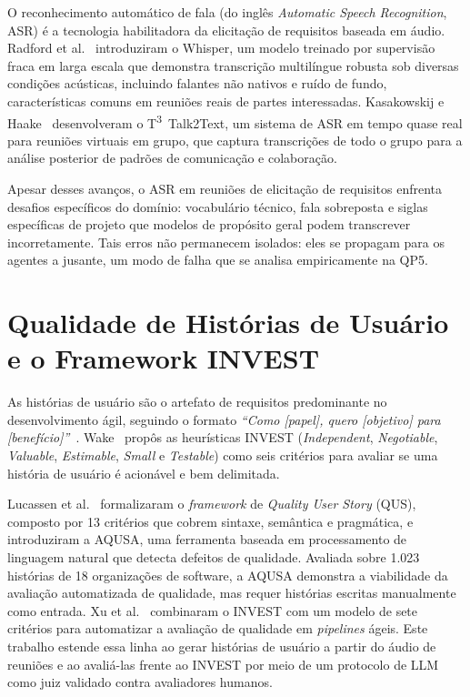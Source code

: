 O reconhecimento automático de fala (do inglês \textit{Automatic Speech Recognition}, ASR) é a tecnologia habilitadora da elicitação de requisitos baseada em áudio. Radford et al.~\cite{whisper2022} introduziram o Whisper, um modelo treinado por supervisão fraca em larga escala que demonstra transcrição multilíngue robusta sob diversas condições acústicas, incluindo falantes não nativos e ruído de fundo, características comuns em reuniões reais de partes interessadas. Kasakowskij e Haake~\cite{kasakowskij2025talk2text} desenvolveram o T\textsuperscript{3}~Talk2Text, um sistema de ASR em tempo quase real para reuniões virtuais em grupo, que captura transcrições de todo o grupo para a análise posterior de padrões de comunicação e colaboração.

Apesar desses avanços, o ASR em reuniões de elicitação de requisitos enfrenta desafios específicos do domínio: vocabulário técnico, fala sobreposta e siglas específicas de projeto que modelos de propósito geral podem transcrever incorretamente. Tais erros não permanecem isolados: eles se propagam para os agentes a jusante, um modo de falha que se analisa empiricamente na QP5.

\section{Qualidade de Histórias de Usuário e o Framework INVEST}

As histórias de usuário são o artefato de requisitos predominante no desenvolvimento ágil, seguindo o formato \textit{``Como [papel], quero [objetivo] para [benefício]''}~\cite{lucassen2016qus}. Wake~\cite{wake2003invest} propôs as heurísticas INVEST (\textit{Independent}, \textit{Negotiable}, \textit{Valuable}, \textit{Estimable}, \textit{Small} e \textit{Testable}) como seis critérios para avaliar se uma história de usuário é acionável e bem delimitada.

Lucassen et al.~\cite{lucassen2016qus} formalizaram o \textit{framework} de \textit{Quality User Story} (QUS), composto por 13 critérios que cobrem sintaxe, semântica e pragmática, e introduziram a AQUSA, uma ferramenta baseada em processamento de linguagem natural que detecta defeitos de qualidade. Avaliada sobre 1.023 histórias de 18 organizações de software, a AQUSA demonstra a viabilidade da avaliação automatizada de qualidade, mas requer histórias escritas manualmente como entrada. Xu et al.~\cite{xu2023requirement} combinaram o INVEST com um modelo de sete critérios para automatizar a avaliação de qualidade em \textit{pipelines} ágeis. Este trabalho estende essa linha ao gerar histórias de usuário a partir do áudio de reuniões e ao avaliá-las frente ao INVEST por meio de um protocolo de LLM como juiz validado contra avaliadores humanos.

